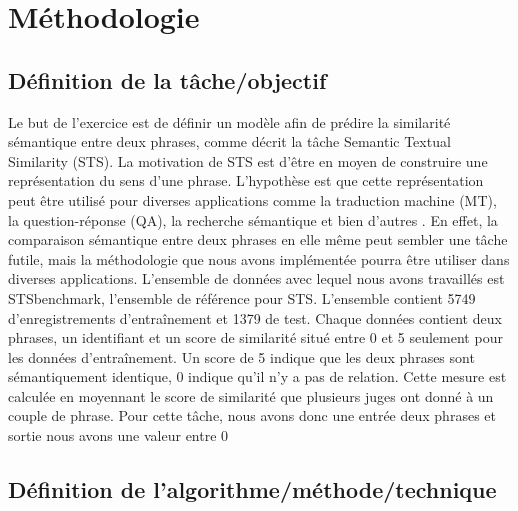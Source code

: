 \documentclass[11pt,a4paper, french]{article}
\begin{document}
%

\section{Méthodologie}


\subsection{Définition de la tâche/objectif}
Le but de l’exercice est de définir un modèle afin de prédire la similarité sémantique entre deux phrases, comme décrit la tâche Semantic Textual Similarity (STS). La motivation de STS est d’être en moyen de construire une représentation du sens d’une phrase. L’hypothèse est que cette représentation peut être utilisé pour diverses applications comme la traduction machine (MT), la question-réponse (QA), la recherche sémantique et bien d’autres \cite{Cer_2017}. En effet, la comparaison sémantique entre deux phrases en elle même peut sembler une tâche futile, mais la méthodologie que nous avons implémentée pourra être utiliser dans diverses applications.
	L’ensemble de données avec lequel nous avons travaillés est STSbenchmark, l’ensemble de référence pour STS. L’ensemble contient 5749 d’enregistrements d'entraînement et 1379 de test. Chaque données contient deux phrases, un identifiant et un score de similarité situé entre 0 et 5 seulement pour les données d'entraînement. Un score de 5 indique que les deux phrases sont sémantiquement identique, 0 indique qu’il n’y a pas de relation. Cette mesure est calculée en moyennant le score de similarité que plusieurs juges ont donné à un couple de phrase. Pour cette tâche, nous avons donc une entrée deux phrases et sortie nous avons une valeur entre 0%



\subsection{Définition de l'algorithme/méthode/technique}
\end{document}
